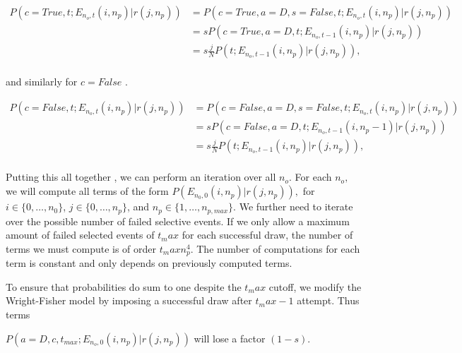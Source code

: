 \documentclass[review]{elsarticle}
\newcommand{\sgcomment}[1]{{\color{red}{SG: #1}}}
\begin{document}
\sgcomment{I think this might want to be: }
 \begin{equation}
\begin{split}
P(c=True, t;  E_{n_o,t}(i,n_p) | r(j, n_p)) &= P(c=True, a=D, s=False, t;  E_{n_o,t}(i,n_p) | r(j, n_p))\\
&= s P(c=True, a=D, t;  E_{n_o,t-1}(i,n_p) | r(j, n_p))\\
&= s \frac{j}{N} P( t;  E_{n_o,t-1}(i,n_p) | r(j, n_p)),\\
\end{split}
\end{equation}


and similarly for $c=False$ \sgcomment{Write out? TODO, not complete}.  

 \begin{equation}
\begin{split}
P(c=False, t;  E_{n_o,t}(i,n_p) | r(j, n_p)) &= P(c=False, a=D, s=False, t;  E_{n_o,t}(i,n_p) | r(j, n_p))\\
&= s P(c=False, a=D, t;  E_{n_o,t-1}(i,n_p-1) | r(j, n_p))\\
&= s \frac{j}{N} P( t;  E_{n_o,t-1}(i,n_p) | r(j, n_p)),\\
\end{split}
\end{equation}




Putting this all together \sgcomment{pseudocode?}, we can perform an iteration over all $n_o.$ For each $n_o,$  we will compute all terms of the form $P(E_{n_0,0}(i,n_p)  | r(j, n_p)),$ for $i\in\{0,\ldots,n_0\}$, $j\in \{0,\ldots,n_p\}$, and $n_p \in\{1,\ldots,n_{p,max}\}.$ We further need to iterate over the possible number of failed selective events. If we only allow a maximum amount of failed selected events of $t_max$ for each successful draw, the number of terms we must compute is of order $t_max n_p^4$. The number of computations for each term is constant and only depends on previously computed terms. 

To ensure that probabilities do sum to one despite the $t_max$ cutoff, we modify the Wright-Fisher model by imposing a successful draw after $t_max-1$ attempt. Thus terms

$P(a=D,c,t_{max}; E_{n_o,0}(i,n_p)  | r(j, n_p))$ will lose a factor $(1-s)$.   
\end{document}
